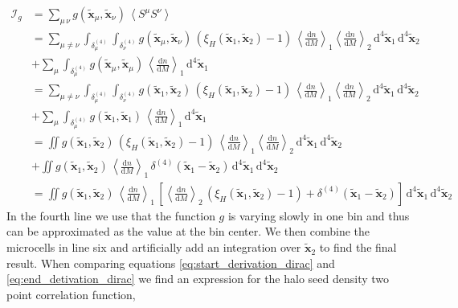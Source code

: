 \documentclass[oneside]{book}
\newcommand*{\rd}{\mathrm{d}}
\begin{document}
\begin{align}
    \mathcal{I}_g &= \sum_{\mu\,\nu} g(\tilde{\boldsymbol{x}}_\mu,\tilde{\boldsymbol{x}}_\nu)\,\left\langle S^\mu S^\nu \right\rangle\\
     &= \sum_{\mu \neq \nu} \int_{\delta^{(4)}_\mu}\int_{\delta^{(4)}_\nu}g(\tilde{\boldsymbol{x}}_\mu,\tilde{\boldsymbol{x}}_\nu)\,( \xi_H(\tilde{\boldsymbol{x}}_1,\tilde{\boldsymbol{x}}_2) -1 )\,\left\langle \frac{\rd n}{\rd M} \right\rangle_1 \left\langle \frac{\rd n}{\rd M} \right\rangle_2 \,\rd^4 \tilde{\boldsymbol{x}}_1\,\rd^4 \tilde{\boldsymbol{x}}_2\nonumber\\
     &+ \sum_{\mu}  \int_{\delta^{(4)}_\mu} g(\tilde{\boldsymbol{x}}_\mu,\tilde{\boldsymbol{x}}_\mu)\,\left\langle \frac{\rd n}{\rd M} \right\rangle_1\,\rd^4 \tilde{\boldsymbol{x}}_1\\
     &= \sum_{\mu \neq \nu} \int_{\delta^{(4)}_\mu}\int_{\delta^{(4)}_\nu}g(\tilde{\boldsymbol{x}}_1,\tilde{\boldsymbol{x}}_2)\,( \xi_H(\tilde{\boldsymbol{x}}_1,\tilde{\boldsymbol{x}}_2) -1 )\,\left\langle \frac{\rd n}{\rd M} \right\rangle_1 \left\langle \frac{\rd n}{\rd M} \right\rangle_2 \,\rd^4 \tilde{\boldsymbol{x}}_1\,\rd^4 \tilde{\boldsymbol{x}}_2\nonumber\\
     &+ \sum_{\mu}  \int_{\delta^{(4)}_\mu} g(\tilde{\boldsymbol{x}}_1,\tilde{\boldsymbol{x}}_1)\,\left\langle \frac{\rd n}{\rd M} \right\rangle_1\,\rd^4 \tilde{\boldsymbol{x}}_1\\
     &= \iint g(\tilde{\boldsymbol{x}}_1,\tilde{\boldsymbol{x}}_2)\,( \xi_H(\tilde{\boldsymbol{x}}_1,\tilde{\boldsymbol{x}}_2) -1 )\,\left\langle \frac{\rd n}{\rd M} \right\rangle_1 \left\langle \frac{\rd n}{\rd M} \right\rangle_2 \,\rd^4 \tilde{\boldsymbol{x}}_1\,\rd^4 \tilde{\boldsymbol{x}}_2\nonumber\\
     &+ \iint g(\tilde{\boldsymbol{x}}_1,\tilde{\boldsymbol{x}}_2)\,\left\langle \frac{\rd n}{\rd M} \right\rangle_1\,\delta^{(4)}(\tilde{\boldsymbol{x}}_1-\tilde{\boldsymbol{x}}_2)\,\rd^4 \tilde{\boldsymbol{x}}_1\,\rd^4 \tilde{\boldsymbol{x}}_2\\
     &= \iint g(\tilde{\boldsymbol{x}}_1,\tilde{\boldsymbol{x}}_2)\,\left\langle \frac{\rd n}{\rd M} \right\rangle_1\,\left[\left\langle \frac{\rd n}{\rd M} \right\rangle_2\,( \xi_H(\tilde{\boldsymbol{x}}_1,\tilde{\boldsymbol{x}}_2) -1 )+\delta^{(4)}(\tilde{\boldsymbol{x}}_1-\tilde{\boldsymbol{x}}_2)\right]\,\rd^4\tilde{\boldsymbol{x}}_1\,\rd^4\tilde{\boldsymbol{x}}_2 \label{eq:end_detivation_dirac}
\end{align}
In the fourth line we use that the function $g$ is varying slowly in one bin and thus can be approximated as the value at the bin center. We then combine the microcells in line six and artificially add an integration over $\tilde{\boldsymbol{x}}_2$ to find the final result. When comparing equations \ref{eq:start_derivation_dirac} and \ref{eq:end_detivation_dirac} we find an expression for the halo seed density two point correlation function, 
\end{document}
